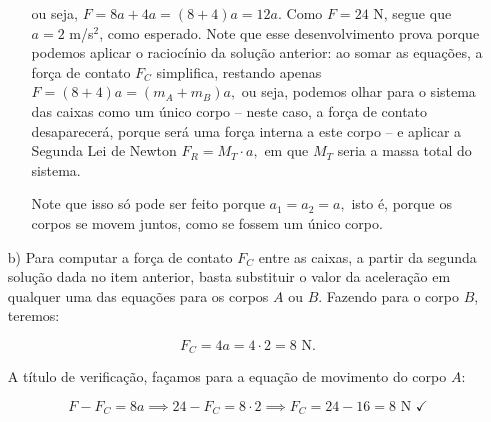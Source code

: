 \begin{exemplo}[Nível II]
\begin{enumerate}
\begin{enumerate}
\noindent ou seja,  $ F = 8a + 4 a = (8+4)a = 12 a.$ Como $F=24$ N, segue que $a= 2$ m/s$^2$, como esperado. Note que esse desenvolvimento prova porque podemos aplicar o raciocínio da solução anterior: ao somar as equações, a força de contato $F_C$ simplifica, restando apenas $F=(8+4)a = (m_A+m_B)a,$ ou seja, podemos olhar para o sistema das caixas como um único corpo -- neste caso, a força de contato desaparecerá, porque será uma força interna a este corpo -- e aplicar a Segunda Lei de Newton $F_R = M_T \cdot a,$ em que $M_T$ seria a massa total do sistema.

Note que isso só pode ser feito porque $a_1=a_2=a,$ isto é, porque os corpos se movem juntos, como se fossem um único corpo.
         
    \end{enumerate}
    
    
    
    \item [b)] Para computar a força de contato $F_C$ entre as caixas, a partir da segunda solução dada no item anterior, basta substituir o valor da aceleração em qualquer uma das equações para os corpos $A$ ou $B$. Fazendo para o corpo $B$, teremos:

    $$ F_C = 4a = 4 \cdot 2 = 8 \text{ N.}$$

    A título de verificação, façamos para a equação de movimento do corpo $A:$

    $$ F - F_C = 8a  \implies 24 - F_C = 8 \cdot 2 \implies F_C = 24 - 16 = 8 \text{ N } \checkmark $$
    
\end{enumerate}



\end{exemplo}



\vspace{0.3cm}


